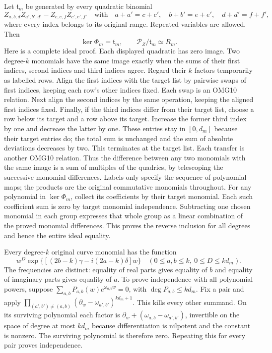\documentclass[11pt,a4paper]{article}
\begin{document}
Let $\mathfrak t_m$ be generated by every quadratic binomial
\[
 Z_{a,b,d}Z_{a',b',d'}-Z_{c,e,f}Z_{c',e',f'}
 \quad\text{with}\quad
 a+a'=c+c',\quad b+b'=e+e',\quad d+d'=f+f',
 \tag{OMG10}
\]
where every index belongs to its original range. Repeated variables
are allowed. Then
\[
 \boxed{\ker\Phi_m=\mathfrak t_m,\qquad
           \mathscr P_Z/\mathfrak t_m\simeq R_m.}
 \tag{OMG11}
\]
Here is a complete ideal proof. Each displayed quadratic has zero
image. Two degree-$k$ monomials have the same image exactly when
the sums of their first indices, second indices and third indices
agree. Regard their $k$ factors temporarily as labelled rows. Align
the first indices with the target list by pairwise swaps of first
indices, keeping each row's other indices fixed. Each swap is an
OMG10 relation. Next align the second indices by the same operation,
keeping the aligned first indices fixed. Finally, if the third
indices differ from their target list, choose a row below its target
and a row above its target. Increase the former third index by one
and decrease the latter by one. These entries stay in $[0,d_m]$
because their target entries do; the total sum is unchanged and the
sum of absolute deviations decreases by two. This terminates at
the target list. Each transfer is another OMG10 relation. Thus the
difference between any two monomials with the same image is a sum
of multiples of the quadrics, by telescoping the successive monomial
differences. Labels only specify the sequence of polynomial maps;
the products are the original commutative monomials throughout.
For any polynomial in $\ker\Phi_m$, collect its coefficients by
their target monomial. Each such coefficient sum is zero by target
monomial independence. Subtracting one chosen monomial in each
group expresses that whole group as a linear combination of the
proved monomial differences. This proves the reverse inclusion for
all degrees and hence the entire ideal equality.

Every degree-$k$ original curve monomial has the function
\[
 w^D\exp\{[(2b-k)\gamma-i(2a-k)\delta]w\}
       \quad(0\le a,b\le k,\ 0\le D\le kd_m).
 \tag{OMG12}
\]
The frequencies are distinct: equality of real parts gives equality
of $b$ and equality of imaginary parts gives equality of $a$.
To prove independence with all polynomial powers, suppose
$\sum_{a,b}P_{a,b}(w)e^{\omega_{a,b}w}=0$, with
$\deg P_{a,b}\le kd_m$. Fix a pair and apply
$\prod_{(a',b')\ne(a,b)}(\partial_w-\omega_{a',b'})^{kd_m+1}$.
This kills every other summand. On its surviving polynomial each
factor is $\partial_w+(\omega_{a,b}-\omega_{a',b'})$, invertible
on the space of degree at most $kd_m$ because differentiation is
nilpotent and the constant is nonzero. The surviving polynomial
is therefore zero. Repeating this for every pair proves independence.
\end{document}
